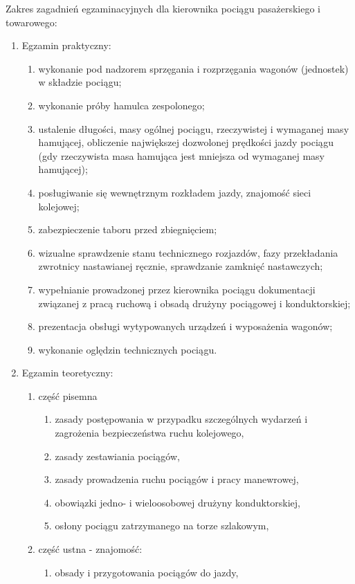 \documentclass[usenames,dvipsnames,svgnames,table,a4paper,openany,justified]{tufte-book}
\begin{document}
Zakres zagadnień egzaminacyjnych dla kierownika pociągu pasażerskiego i towarowego:
 \begin{enumerate}
 	\item Egzamin praktyczny:
 	\begin{enumerate}
 		\item wykonanie pod nadzorem sprzęgania i rozprzęgania wagonów (jednostek) w składzie
 		pociągu;
 		\item wykonanie próby hamulca zespolonego;
 		\item ustalenie długości, masy ogólnej pociągu, rzeczywistej i wymaganej masy hamującej, obliczenie największej dozwolonej prędkości jazdy pociągu (gdy rzeczywista masa hamująca jest mniejsza od wymaganej masy hamującej);
 		\item posługiwanie się wewnętrznym rozkładem jazdy, znajomość sieci kolejowej;
 		\item zabezpieczenie taboru przed zbiegnięciem;
 		\item wizualne sprawdzenie stanu technicznego rozjazdów, fazy przekładania zwrotnicy nastawianej ręcznie, sprawdzanie zamknięć nastawczych;
 		\item wypełnianie prowadzonej przez kierownika pociągu dokumentacji związanej z pracą ruchową i obsadą drużyny pociągowej i konduktorskiej;
 		\item prezentacja obsługi wytypowanych urządzeń i wyposażenia wagonów;
 		\item wykonanie oględzin technicznych pociągu.
 	\end{enumerate}
 	\item Egzamin teoretyczny:
 	\begin{enumerate}
 		\item część pisemna
 		\begin{enumerate}
 			\item zasady postępowania w przypadku szczególnych wydarzeń i zagrożenia bezpieczeństwa ruchu kolejowego,
 			\item zasady zestawiania pociągów,
 			\item zasady prowadzenia ruchu pociągów i pracy manewrowej,
 			\item obowiązki jedno- i wieloosobowej drużyny konduktorskiej,
 			\item osłony pociągu zatrzymanego na torze szlakowym,
 		\end{enumerate}
 		\item część ustna - znajomość:
 		\begin{enumerate}
 			\item obsady i przygotowania pociągów do jazdy,

\end{enumerate}
\end{enumerate}
\end{enumerate}
\end{document}
